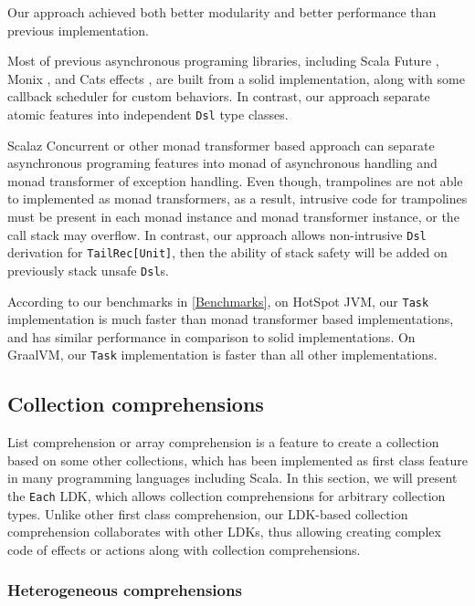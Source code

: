 Our approach achieved both better modularity and better performance than previous implementation.

Most of previous asynchronous programing libraries, including Scala Future \cite{haller2012sip}, Monix \cite{nedelcu2017monix}, and Cats effects \cite{typelevel2017cats}, are built from a solid implementation, along with some callback scheduler for custom behaviors. In contrast, our approach separate atomic features into independent \lstinline{Dsl} type classes.

Scalaz Concurrent \cite{kenji2017scalaz} or other monad transformer \cite{liang1995monad} based approach can separate asynchronous programing features into monad of asynchronous handling and monad transformer of exception handling. Even though, trampolines are not able to implemented as monad transformers, as a result, intrusive code for trampolines must be present in each monad instance and monad transformer instance, or the call stack may overflow. In contrast, our approach allows non-intrusive \lstinline{Dsl} derivation for \lstinline{TailRec[Unit]}, then the ability of stack safety will be added on previously stack unsafe \lstinline{Dsl}s.

According to our benchmarks in \cref{Benchmarks}, on HotSpot JVM, our \lstinline{Task} implementation is much faster than monad transformer based implementations, and has similar performance in comparison to solid implementations. On GraalVM, our \lstinline{Task} implementation is faster than all other implementations.
\subsection{Collection comprehensions}\label{Collection comprehensions}

List comprehension or array comprehension is a feature to create a collection based on some other collections, which has been implemented as first class feature in many programming languages including Scala. In this section, we will present the \lstinline{Each} LDK, which allows collection comprehensions for arbitrary collection types. Unlike other first class comprehension, our LDK-based collection comprehension collaborates with other LDKs, thus allowing creating complex code of effects or actions along with collection comprehensions.

\subsubsection{Heterogeneous comprehensions}\label{Heterogeneous comprehensions}

